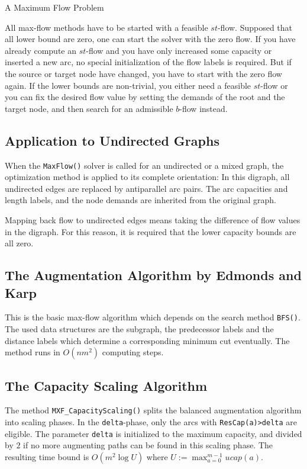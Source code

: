 \documentclass[a4paper,11pt,twoside]{book}
\begin{document}
\begin{multicols}{2}
\bigskip
\begin{figurehere}
\begin{center}
\epsfxsize=11cm
\vspace{0.5cm}
\caption{\label{flb_maxflow}A Maximum Flow Problem}
\end{center}
\end{figurehere}

All max-flow methods have to be started with a feasible $st$-flow. Supposed
that all lower bound are zero, one can start the solver with the zero flow.
If you have already compute an $st$-flow and you have only increased some
capacity or inserted a new arc, no special initialization of the flow labels
is required. But if the source or target node have changed, you have to start
with the zero flow again. If the lower bounds are non-trivial, you either need
a feasible $st$-flow or you can fix the desired flow value by setting the
demands of the root and the target node, and then search for an admissible
$b$-flow instead.


\subsection{Application to Undirected Graphs}
When the \verb/MaxFlow()/ solver is called for an undirected or a mixed graph,
the optimization method is applied to its complete orientation: In this digraph,
all undirected edges are replaced by antiparallel arc pairs. The arc capacities
and length labels, and the node demands are inherited from the original graph.

Mapping back flow to undirected edges means taking the difference of flow values
in the digraph. For this reason, it is required that the lower capacity bounds
are all zero.


\subsection{The Augmentation Algorithm by Edmonds and Karp}
This is the basic max-flow algorithm which depends on the search method
\verb/BFS()/. The used data structures are the subgraph, the predecessor
labels and the distance labels which determine a corresponding minimum cut
eventually. The method runs in $O(nm^2)$ computing steps.


\subsection{The Capacity Scaling Algorithm}
The method \verb/MXF_CapacityScaling()/ splits the balanced augmentation algorithm
into scaling phases. In the \verb/delta/-phase, only the arcs with
\verb/ResCap(a)>delta/ are eligible. The parameter \verb/delta/ is
initialized to the maximum capacity, and divided by $2$ if no more
augmenting paths can be found in this scaling phase. The resulting time bound
is $O(m^2\log{U})$ where $U:=\max_{a=0}^{m-1}ucap(a)$.



\end{multicols}
\end{document}
